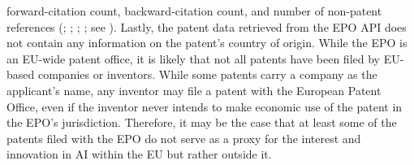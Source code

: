 \documentclass[
  12pt,
  a4paperpaper,
]{article}
\begin{document}
forward-citation count, backward-citation count, and number of
non-patent references (; ; ; ;
see ). Lastly, the patent data retrieved from the EPO API does not
contain any information on the patent's country of origin. While the EPO
is an EU-wide patent office, it is likely that not all patents have been
filed by EU-based companies or inventors. While some patents carry a
company as the applicant's name, any inventor may file a patent with the
European Patent Office, even if the inventor never intends to make
economic use of the patent in the EPO's jurisdiction. Therefore, it may
be the case that at least some of the patents filed with the EPO do not
serve as a proxy for the interest and innovation in AI within the EU but
rather outside it.
\end{document}
